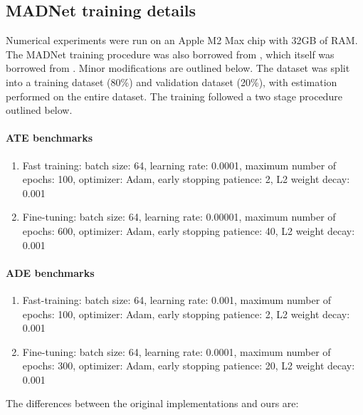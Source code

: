 \subsection{MADNet training details} \label{sec:training-deets}

Numerical experiments were run on an Apple M2 Max chip with 32GB of RAM. The MADNet training procedure was also borrowed from \citet[Appendix A1]{Chernozhukov2022}, which itself was borrowed from \citet{Shi2019}. Minor modifications are outlined below. The dataset was split into a training dataset (80\%) and validation dataset (20\%), with estimation performed on the entire dataset. The training followed a two stage procedure outlined below.

\paragraph{ATE benchmarks}

\begin{enumerate}
    \item Fast training: batch size: 64, learning rate: 0.0001, maximum number of epochs: 100, optimizer: Adam, early stopping patience: 2, L2 weight decay: 0.001
    \item Fine-tuning: batch size: 64, learning rate: 0.00001, maximum number of epochs: 600, optimizer: Adam, early stopping patience: 40, L2 weight decay: 0.001
\end{enumerate}

\paragraph{ADE benchmarks}

\begin{enumerate}
    \item Fast-training: batch size: 64, learning rate: 0.001, maximum number of epochs: 100, optimizer: Adam, early stopping patience: 2, L2 weight decay: 0.001
    \item Fine-tuning: batch size: 64, learning rate: 0.0001, maximum number of epochs: 300, optimizer: Adam, early stopping patience: 20, L2 weight decay: 0.001
\end{enumerate}

The differences between the original implementations and ours are:

